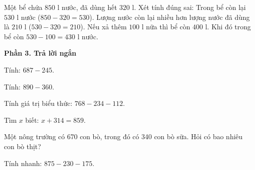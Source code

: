 \begin{ex} %
Một bể chứa $850\text{ l}$ nước, đã dùng hết $320\text{ l}$. Xét tính đúng sai:
\choiceTF
{\True Trong bể còn lại $530\text{ l}$ nước ($850 - 320 = 530$).}
{\True Lượng nước còn lại nhiều hơn lượng nước đã dùng là $210\text{ l}$ ($530 - 320 = 210$).}
{Nếu xả thêm $100\text{ l}$ nữa thì bể còn $400\text{ l}$.}
{\True Khi đó trong bể còn $530 - 100 = 430\text{ l}$ nước.}
\end{ex}

\textbf{Phần 3. Trả lời ngắn}

\begin{ex} %
Tính: $687 - 245$.
\end{ex}

\begin{ex} %
Tính: $890 - 360$.
\end{ex}

\begin{ex} %
Tính giá trị biểu thức: $768 - 234 - 112$.
\end{ex}

\begin{ex} %
Tìm $x$ biết: $x + 314 = 859$.
\end{ex}

\begin{ex} %
Một nông trường có 670 con bò, trong đó có 340 con bò sữa. Hỏi có bao nhiêu con bò thịt?
\end{ex}

\begin{ex} %
Tính nhanh: $875 - 230 - 175$.
\end{ex}

